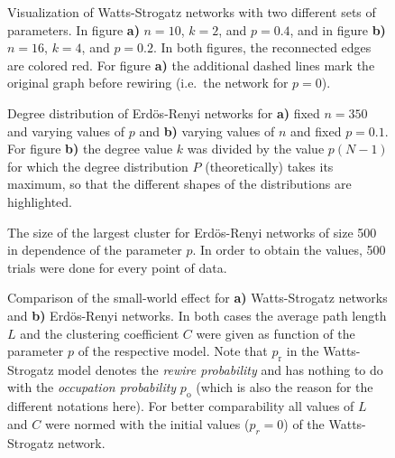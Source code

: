 \documentclass{scrartcl}
\begin{document}
\begin{figure}
    \centering
    \def\svgwidth{0.8\columnwidth}
    
    \caption{Visualization of Watts-Strogatz networks with two different
        sets of parameters. In figure \textbf{a)} $n=10$, $k=2$, and
        $p=0.4$, and in figure \textbf{b)} $n=16$, $k=4$, and $p=0.2$. In
        both figures, the reconnected edges are colored red. For figure
        \textbf{a)} the additional dashed lines mark the original graph
    before rewiring (i.e.\ the network for $p=0$).}
    \label{13_ws}
\end{figure}

\begin{figure}
    \caption{Degree distribution of Erdös-Renyi networks for \textbf{a)}
    fixed $n=350$ and varying values of $p$ and \textbf{b)} varying values
    of $n$ and fixed $p=0.1$. For figure \textbf{b)} the degree value $k$ was
    divided by the value $p(N-1)$ for which the degree distribution $P$
    (theoretically) takes its maximum, so that the different shapes of the
    distributions are highlighted.}
    \label{fig:12_er}
\end{figure}

\begin{figure}
    \centering
    \caption{The size of the largest cluster for Erdös-Renyi networks of
        size 500 in dependence of the parameter $p$. In order to obtain the
        values, 500 trials were done for every point of data.}
    \label{fig:12_largest}
\end{figure}


\begin{figure}
    \caption{Comparison of the small-world effect for \textbf{a)}
    Watts-Strogatz networks and \textbf{b)} Erdös-Renyi networks. In both
    cases the average path length $L$ and the clustering coefficient $C$
    were given as function of the parameter $p$ of the respective model.
    Note that $p_\mathrm{r}$ in the Watts-Strogatz model denotes the
    \emph{rewire probability} and has nothing to do with the
    \emph{occupation probability} $p_\mathrm{o}$ (which is also the reason
    for the different notations here). For better comparability all values
    of $L$ and $C$ were normed with the initial values ($p_r=0$) of the
    Watts-Strogatz network.}
    \label{fig:13_sm_effect}
\end{figure}
\end{document}
